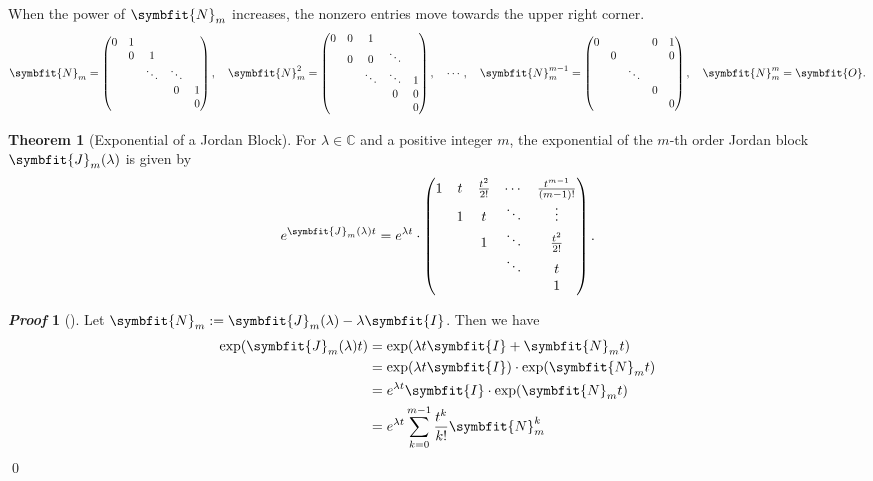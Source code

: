 \documentclass[10pt,UTF8]{article}
\newcommand{\mat}[1]{\symbfit{#1}}
\newenvironment{theoremBox}
{ \bigskip
  \begin{tcolorbox}[colback=yellow!5!white,colframe=yellow!75!black,parbox=false,before
  upper=\par,before lower=\par]}
  {
\end{tcolorbox}}
\theoremstyle{definition}
\newtheorem{definition inner}{Definition}[section]
\theoremstyle{definition}
\newtheorem{theorem inner}{Theorem}[section]
\newenvironment{theorem}[1][]
{
  \begin{theoremBox}
  \begin{theorem inner}[#1]\hfill\par}
    {
    \end{theorem inner}
\end{theoremBox}}
\theoremstyle{definition}
\newtheorem*{proof inner}{\textit{Proof}}
\renewenvironment{proof}[1][]
{
\begin{proof inner}[#1]\hfill\par}
  {\qed\vphantom{.}
\end{proof inner}}
\theoremstyle{plain}
\newtheorem{tip inner}{Tip}[section]
\theoremstyle{remark}
\begin{document}
When the power of \(\mat{N}_m\) increases,
the nonzero entries move towards the upper right corner.
\begin{equation*}
  \mat{N}_m =
  \begin{pmatrix}
    0 & 1 & & & \\ & 0 & 1 & & \\ & & \ddots & \ddots &  \\ & & & 0 &
    1 \\ & & & & 0
  \end{pmatrix}, \quad
  \mat{N}_m^2 =
  \begin{pmatrix}
    0 & 0 & 1 & & \\ & 0 & 0 & \ddots & \\ & & \ddots & \ddots &
    1 \\ & & & 0 & 0 \\ & & & & 0
  \end{pmatrix}, \quad
  \cdots, \quad
  \mat{N}_m^{m-1} =
  \begin{pmatrix}
    0 & & & 0 & 1 \\ & 0 & & & 0 \\ & & \ddots & & \\ & & & 0 &
    \\ & & & & 0
  \end{pmatrix}, \quad
  \mat{N}_m^m = \mat{O}.
\end{equation*}

\begin{theorem}[Exponential of a Jordan Block]
  {}\label{thm: exp of Jordan block}
  For \(\lambda \in \mathbb{C}\) and a positive integer \(m\),
  the exponential of the \(m\)-th order Jordan block
  \(\mat{J}_m(\lambda)\) is given by
  \begin{equation*}
    e^{\mat{J}_m(\lambda) t} =
    e^{\lambda t} \cdot
    \begin{pmatrix}
      1 & t & \frac{t^2}{2!} & \cdots & \frac{t^{m-1}}{(m-1)!} \\
      & 1 & t & \ddots & \vdots \\ & & 1 & \ddots & \frac{t^2}{2!} \\ &
      & & \ddots & t \\ & & & & 1
    \end{pmatrix}.
  \end{equation*}
\end{theorem}
\begin{proof}
  Let \(\mat{N}_m := \mat{J}_m(\lambda) - \lambda\mat{I}\).
  Then we have
  \begin{align*}
    \exp(\mat{J}_m(\lambda) t) &= \exp(\lambda t \mat{I} + \mat{N}_m t) \\
    &= \exp(\lambda t \mat{I}) \cdot \exp(\mat{N}_m t) \\
    &= e^{\lambda t} \mat{I} \cdot \exp(\mat{N}_m t) \\
    &= e^{\lambda t} \sum_{k=0}^{m-1} \frac{t^k}{k!} \mat{N}_m^k
  \end{align*}
\end{proof}
\end{document}
